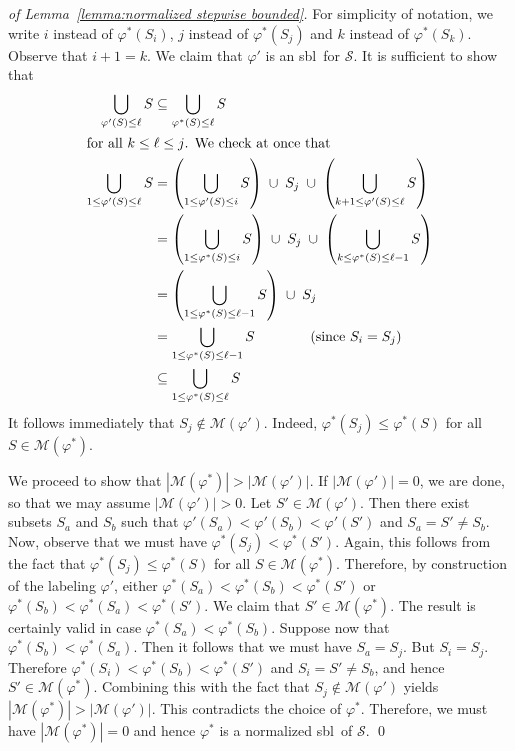 \documentclass[a4paper,10pt]{llncs}
\newcommand{\SBL}{sbl}
\begin{document}
\begin{proof}[of Lemma~\ref{lemma:normalized stepwise bounded}]
  For simplicity of notation, we write $i$ instead of $\varphi^*(S_i)$,
  $j$ instead of $\varphi^*(S_j)$ and $k$ instead of
  $\varphi^*(S_k)$. Observe that $i+1 = k$. We claim that $\varphi'$ is
  an \SBL\ for $\mathcal{S}$. It is sufficient to show that 
  \begin{align*}
    \bigcup_{\varphi'(S) \leq \ell} S &\subseteq \bigcup_{\varphi^*(S) \leq \ell} S \\
    \intertext{for all $k \leq \ell \leq j$. We check at once that}
    \bigcup_{1 \leq \varphi'(S) \leq \ell} S &= \left( \bigcup_{1 \leq \varphi'(S) \leq i} S \right) \;\cup\; S_j \;\cup\; \left( \bigcup_{k+1 \leq \varphi'(S) \leq \ell} S \right) \\
    &= \left( \bigcup_{1 \leq \varphi^*(S) \leq i} S \right) \;\cup\; S_j \;\cup\; \left( \bigcup_{k \leq \varphi^*(S) \leq \ell-1} S \right) \\
    &= \left( \bigcup_{1 \leq \varphi^*(S) \leq \ell-1} S \right) \;\cup\; S_j \\
    &= \bigcup_{1 \leq \varphi^*(S) \leq \ell-1} S \qquad\qquad \text{(since $S_i = S_j$)} \\
    &\subseteq \bigcup_{1 \leq \varphi^*(S) \leq \ell} S
  \end{align*}
  It follows immediately that $S_j \notin \mathcal{M}(\varphi')$. Indeed, $\varphi^*(S_j) \leq \varphi^*(S)$ for all $S \in \mathcal{M}(\varphi^*)$.

  We proceed to show that $|\mathcal{M}(\varphi^*)| >
  |\mathcal{M}(\varphi')|$. If $|\mathcal{M}(\varphi')| = 0$, we are done, so
  that we may assume $|\mathcal{M}(\varphi')| > 0$. Let $S' \in
  \mathcal{M}(\varphi')$. Then there exist subsets $S_a$ and $S_b$ such that
  $\varphi'(S_a) < \varphi'(S_b) < \varphi'(S')$ and $S_a = S' \neq S_b$. Now,
  observe that we must have $\varphi^*(S_j) < \varphi^*(S')$. Again, this follows
  from the fact that $\varphi^*(S_j) \leq \varphi^*(S)$ for all $S \in
  \mathcal{M}(\varphi^*)$. Therefore, by construction of the labeling
  $\varphi'$, either $\varphi^*(S_a) < \varphi^*(S_b) < \varphi^*(S')$ or $\varphi^*(S_b) <
  \varphi^*(S_a) < \varphi^*(S')$. We claim that $S' \in \mathcal{M}(\varphi^*)$. The
  result is certainly valid in case $\varphi^*(S_a) < \varphi^*(S_b)$. Suppose now
  that $\varphi^*(S_b) < \varphi^*(S_a)$. Then it follows that we must have $S_a =
  S_j$. But $S_i = S_j$. Therefore $\varphi^*(S_i) < \varphi^*(S_b) < \varphi^*(S')$
  and $S_i = S' \neq S_b$, and hence $S' \in
  \mathcal{M}(\varphi^*)$. Combining this with the fact that $S_j \notin
  \mathcal{M}(\varphi')$ yields  $|\mathcal{M}(\varphi^*)| >
  |\mathcal{M}(\varphi')|$. This contradicts the choice of
  $\varphi^*$. Therefore, we must have $|\mathcal{M}(\varphi^*)| = 0$ and hence
  $\varphi^*$ is a normalized \SBL\ of $\mathcal{S}$.
  \qed
\end{proof}
\end{document}
